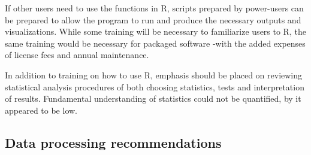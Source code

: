 If other users need to use the functions in R, scripts prepared by power-users can be prepared to allow the program to run and produce the necessary outputs and visualizations. While some training will be necessary to familiarize users to R, the same training would be necessary for packaged software -with the added expenses of license fees and annual maintenance.

In addition to training on how to use R, emphasis should be placed on reviewing statistical analysis procedures of both choosing statistics, tests and interpretation of results. Fundamental understanding of statistics could not be quantified, by it appeared to be low.

\subsection{Data processing recommendations}
